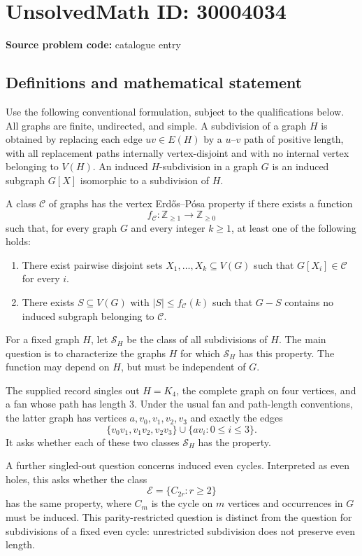 \documentclass[11pt]{article}
\newcommand{\Z}{\mathbb{Z}}
\begin{document}
\section*{UnsolvedMath ID: 30004034}
\textbf{Source problem code:} catalogue entry
\subsection{Definitions and mathematical statement}
Use the following conventional formulation, subject to the qualifications below. All graphs are finite, undirected, and simple. A subdivision of a graph \(H\) is obtained by replacing each edge \(uv\in E(H)\) by a \(u\)--\(v\) path of positive length, with all replacement paths internally vertex-disjoint and with no internal vertex belonging to \(V(H)\). An induced \(H\)-subdivision in a graph \(G\) is an induced subgraph \(G[X]\) isomorphic to a subdivision of \(H\).

A class \(\mathcal C\) of graphs has the vertex Erdős--Pósa property if there exists a function
\[
f_{\mathcal C}\colon \Z_{\geq 1}\longrightarrow \Z_{\geq 0}
\]
such that, for every graph \(G\) and every integer \(k\geq 1\), at least one of the following holds:
\begin{enumerate}
\item There exist pairwise disjoint sets \(X_1,\ldots,X_k\subseteq V(G)\) such that \(G[X_i]\in\mathcal C\) for every \(i\).
\item There exists \(S\subseteq V(G)\) with \(|S|\leq f_{\mathcal C}(k)\) such that \(G-S\) contains no induced subgraph belonging to \(\mathcal C\).
\end{enumerate}
For a fixed graph \(H\), let \(\mathcal S_H\) be the class of all subdivisions of \(H\). The main question is to characterize the graphs \(H\) for which \(\mathcal S_H\) has this property. The function may depend on \(H\), but must be independent of \(G\).

The supplied record singles out \(H=K_4\), the complete graph on four vertices, and a fan whose path has length \(3\). Under the usual fan and path-length conventions, the latter graph has vertices \(a,v_0,v_1,v_2,v_3\) and exactly the edges
\[
\{v_0v_1,v_1v_2,v_2v_3\}\cup\{av_i:0\leq i\leq 3\}.
\]
It asks whether each of these two classes \(\mathcal S_H\) has the property.

A further singled-out question concerns induced even cycles. Interpreted as even holes, this asks whether the class
\[
\mathcal E=\{C_{2r}:r\geq 2\}
\]
has the same property, where \(C_m\) is the cycle on \(m\) vertices and occurrences in \(G\) must be induced. This parity-restricted question is distinct from the question for subdivisions of a fixed even cycle: unrestricted subdivision does not preserve even length.
\end{document}
